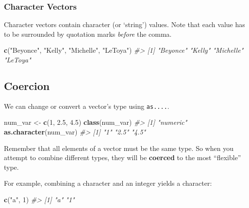 \documentclass[]{book}
\newenvironment{Shaded}{\begin{snugshade}}{\end{snugshade}}
\newcommand{\KeywordTok}[1]{\textcolor[rgb]{0.13,0.29,0.53}{\textbf{#1}}}
\newcommand{\DecValTok}[1]{\textcolor[rgb]{0.00,0.00,0.81}{#1}}
\newcommand{\FloatTok}[1]{\textcolor[rgb]{0.00,0.00,0.81}{#1}}
\newcommand{\StringTok}[1]{\textcolor[rgb]{0.31,0.60,0.02}{#1}}
\newcommand{\CommentTok}[1]{\textcolor[rgb]{0.56,0.35,0.01}{\textit{#1}}}
\newcommand{\NormalTok}[1]{#1}
\begin{document}
\subsubsection*{Character Vectors}\label{character-vectors}

Character vectors contain character (or `string') values. Note that each
value has to be surrounded by quotation marks \emph{before} the comma.

\begin{Shaded}
\begin{Highlighting}[]
\KeywordTok{c}\NormalTok{(}\StringTok{"Beyonce"}\NormalTok{, }\StringTok{"Kelly"}\NormalTok{, }\StringTok{"Michelle"}\NormalTok{, }\StringTok{"LeToya"}\NormalTok{)}
\CommentTok{#> [1] "Beyonce"  "Kelly"    "Michelle" "LeToya"}
\end{Highlighting}
\end{Shaded}

\subsection{Coercion}\label{coercion-1}

We can change or convert a vector's type using \texttt{as....}.

\begin{Shaded}
\begin{Highlighting}[]
\NormalTok{num_var <-}\StringTok{ }\KeywordTok{c}\NormalTok{(}\DecValTok{1}\NormalTok{, }\FloatTok{2.5}\NormalTok{, }\FloatTok{4.5}\NormalTok{)}
\KeywordTok{class}\NormalTok{(num_var)}
\CommentTok{#> [1] "numeric"}
\KeywordTok{as.character}\NormalTok{(num_var)}
\CommentTok{#> [1] "1"   "2.5" "4.5"}
\end{Highlighting}
\end{Shaded}

Remember that all elements of a vector must be the same type. So when
you attempt to combine different types, they will be \textbf{coerced} to
the most ``flexible'' type.

For example, combining a character and an integer yields a character:

\begin{Shaded}
\begin{Highlighting}[]
\KeywordTok{c}\NormalTok{(}\StringTok{"a"}\NormalTok{, }\DecValTok{1}\NormalTok{)}
\CommentTok{#> [1] "a" "1"}
\end{Highlighting}
\end{Shaded}
\end{document}
